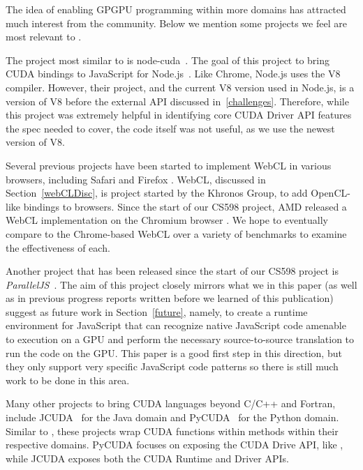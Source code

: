 
The idea of enabling GPGPU programming within more domains has attracted much
interest from the community. Below we mention some projects we feel are most relevant
to \namens.

The project most similar to \name is node-cuda~\cite{nodeCuda}. The goal of this
project to bring CUDA bindings to JavaScript for Node.js~\cite{nodeJS}. Like
Chrome, Node.js uses the V8 compiler. However, their project, and the current V8
version used in Node.js, is a version of V8 before the external API discussed
in~\ref{challenges}. Therefore, while this project was extremely helpful in
identifying core CUDA Driver API features the \name spec needed to cover, the
code itself was not useful, as we use the newest version of V8.

Several previous projects have been started to implement WebCL \cite{webCL} in various
browsers, including Safari \cite{safariCL} and Firefox \cite{nokiaCL}.
WebCL, discussed in Section~\ref{webCLDisc}, is project started by the Khronos
Group, to add OpenCL-like bindings to browsers. Since the start of our CS598
project, AMD released a WebCL implementation on the Chromium browser
\cite{chromeCL}. We hope to eventually compare \name to the Chrome-based
WebCL over a variety of benchmarks to examine the effectiveness of each.

Another project that has been released since the start of our CS598 project is
\textit{ParallelJS}~\cite{parallelJS}. The aim of this project closely mirrors
what we in this paper (as well as in previous progress reports written before we
learned of this publication) suggest as future work in Section~\ref{future}, namely, to create a
runtime environment for JavaScript that can recognize native JavaScript code amenable to
execution on a GPU and perform the necessary source-to-source translation to run
the code on the GPU. This paper is a good first step in this direction, but
they only support very specific JavaScript code patterns so there is still much
work to be done in this area.

Many other projects to bring CUDA languages beyond C/C++ and Fortran, include
JCUDA~\cite{jcuda} for the Java domain and PyCUDA~\cite{pycuda} for the Python domain.
Similar to \namens, these projects wrap CUDA functions within methods within
their respective domains. PyCUDA focuses on exposing the CUDA Drive API, like
\namens, while JCUDA exposes both the CUDA Runtime and Driver APIs.


